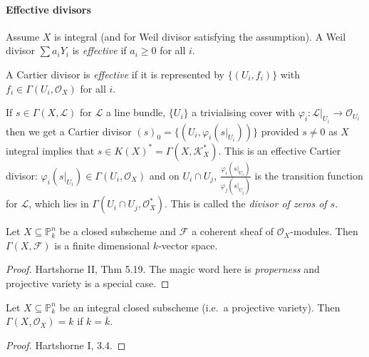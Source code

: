 \documentclass[a4paper]{article}
\renewcommand*{\P}{\mathbb{P}}
\newcommand{\sh}[1]{\mathcal{#1}} %
\begin{document}
\paragraph{Effective divisors}

\begin{definition}
  Assume \(X\) is integral (and for Weil divisor satisfying the assumption). A Weil divisor \(\sum a_i Y_i\) is \emph{effective} if \(a_i \geq 0\) for all \(i\).

  A Cartier divisor is \emph{effective} if it is represented by \(\{(U_i, f_i)\}\) with \(f_i \in \Gamma(U_i, \sh O_X)\) for all \(i\).
\end{definition}

If \(s \in \Gamma(X, \sh L)\) for \(\sh L\) a line bundle, \(\{U_i\}\) a trivialising cover with \(\varphi_i: \sh L|_{U_i} \to \sh O_{U_i}\) then we get a Cartier divisor \((s)_0 = \{(U_i, \varphi_i(s|_{U_i}))\}\) provided \(s \neq 0\) as \(X\) integral implies that \(s \in K(X)^* = \Gamma(X, \sh K_X^*)\). This is an effective Cartier divisor: \(\varphi_i(s|_{U_i}) \in \Gamma(U_i, \sh O_X)\) and on \(U_i \cap U_j\), \(\frac{\varphi_i(s|_{U_i})}{\varphi_j(s|_{U_j})}\) is the transition function for \(\sh L\), which lies in \(\Gamma(U_i \cap U_j, \sh O_X^*)\). This is called the \emph{divisor of zeros of \(s\)}.

\begin{theorem}
  Let \(X \subseteq \P^n_k\) be a closed subscheme and \(\sh F\) a coherent sheaf of \(\sh O_X\)-modules. Then \(\Gamma(X, \sh F)\) is a finite dimensional \(k\)-vector space.
\end{theorem}

\begin{proof}
  Hartshorne II, Thm 5.19. The magic word here is \emph{properness} and projective variety is a special case.
\end{proof}

\begin{theorem}
  Let \(X \subseteq \P^n_k\) be an integral closed subscheme (i.e.\ a projective variety). Then \(\Gamma(X, \sh O_X) = k\) if \(k = \overline k\).
\end{theorem}

\begin{proof}
  Hartshorne I, 3.4.
\end{proof}
\end{document}
